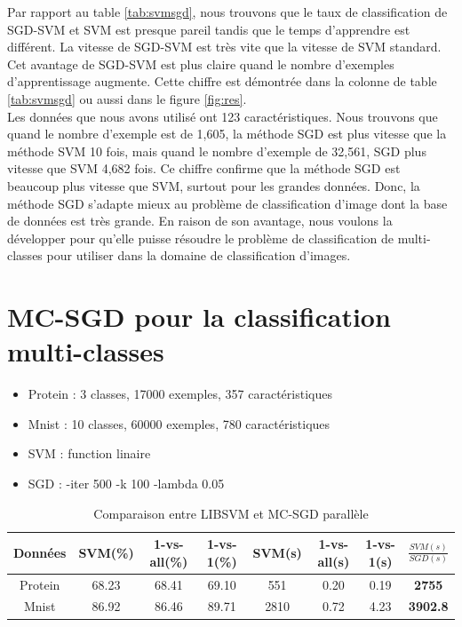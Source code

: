 \pagebreak
Par rapport au table \ref{tab:svmsgd}, nous trouvons que le taux de classification de SGD-SVM et SVM est presque pareil tandis que le temps d'apprendre est différent. La vitesse de SGD-SVM est très vite que la vitesse de SVM standard. Cet avantage de SGD-SVM est plus claire quand le nombre d'exemples d'apprentissage augmente. Cette chiffre est démontrée dans la colonne de table \ref{tab:svmsgd} ou aussi dans le figure \ref{fig:res}.\\

Les données que nous avons utilisé ont 123 caractéristiques. Nous trouvons que quand le nombre d'exemple est de 1,605, la méthode SGD est plus vitesse que la méthode SVM 10 fois, mais quand le nombre d'exemple de 32,561, SGD plus vitesse que SVM 4,682 fois. Ce chiffre confirme que la méthode SGD est beaucoup plus vitesse que SVM, surtout pour les grandes données. Donc, la méthode SGD s'adapte mieux au problème de classification d'image dont la base de données est très grande. En raison de son avantage, nous voulons la développer pour qu'elle puisse résoudre le problème de classification de multi-classes pour utiliser dans la domaine de classification d'images.

\section{MC-SGD pour la classification multi-classes}
\begin{itemize}
\item Protein : 3 classes, 17000 exemples, 357 caractéristiques
\item Mnist : 10 classes, 60000 exemples, 780 caractéristiques
\item SVM : function linaire
\item SGD : -iter 500 -k 100 -lambda 0.05
\end{itemize}

\begin{table}[h]
\begin{center}
    \begin{tabular}{ | c | c | c | c | c | c | c | c |}
    \hline
    Données & SVM(\%) & 1-vs-all(\%) & 1-vs-1(\%) & SVM(s) & 1-vs-all(s) & 1-vs-1(s) & $\frac{SVM(s)}{SGD(s)}$ \\ \hline
    
    Protein & 68.23 & 68.41 & 69.10 & 551 & 0.20 & 0.19 & \textbf{2755} \\ \hline
    
    Mnist & 86.92 & 86.46 & 89.71 & 2810 & 0.72 & 4.23 & \textbf{3902.8} \\ \hline
    
    \end{tabular}
\end{center}
\caption{Comparaison entre LIBSVM et MC-SGD parallèle}
\label{tab:pmcsvm}
\end{table}

